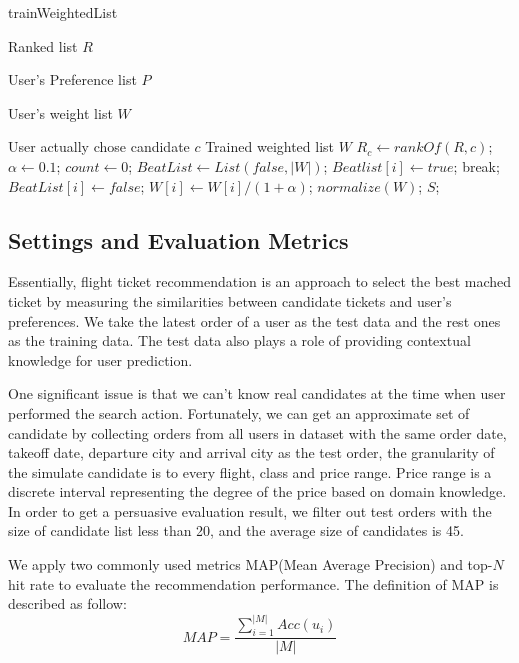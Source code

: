 \documentclass{llncs}
\begin{document}
\begin{algorithm}[htb]
\caption{trainWeightedList}
\begin{algorithmic}[1]
\label{alg:6}
\REQUIRE \par
Ranked list $R$ \par
User's Preference list $P$ \par
User's weight list $W$ \par
User actually chose candidate $c$
\ENSURE Trained weighted list $W$
\STATE $R_c \leftarrow rankOf(R,c)$;
\STATE $\alpha \leftarrow 0.1$;
\STATE $count \leftarrow 0$;
\STATE $BeatList \leftarrow List(false,|W|)$;
\STATE $Beatlist[i] \leftarrow true$;
\STATE break;
\ENDIF
\ENDFOR
{}
\STATE $BeatList[i] \leftarrow false$;
\STATE $W[i] \leftarrow W[i] / (1+\alpha)$;
\ENDIF
\ENDFOR
\ENDWHILE
\STATE $normalize(W)$;
\RETURN $S$;
\end{algorithmic} 
\end{algorithm}


\subsection{Settings and Evaluation Metrics}
Essentially, flight ticket recommendation is an approach to select the best mached ticket by measuring the similarities between candidate tickets and user's preferences. We take the latest order of a user as the test data and the rest ones as the training data. The test data also plays a role of providing contextual knowledge for user prediction.\par
One significant issue is that we can't know real candidates at the time when user performed the search action. Fortunately, we can get an approximate set of candidate by collecting orders from all users in dataset with the same order date, takeoff date, departure city and arrival city as the test order, the granularity of the simulate candidate is to every flight, class and price range. Price range is a discrete interval representing the degree of the price based on domain knowledge. In order to get a persuasive evaluation result, we filter out test orders with the size of candidate list less than 20, and the average size of candidates is 45.\par
We apply two commonly used metrics MAP(Mean Average Precision) and top-$N$ hit rate to evaluate the recommendation performance. The definition of MAP is described as follow:\\
\begin{equation}
MAP = \frac{\sum_{i=1}^{|M|}Acc(u_i)}{|M|}
\end{equation}
\end{document}
